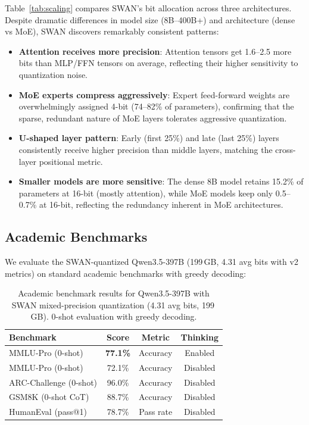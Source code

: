 \documentclass{article}
\begin{document}


Table~\ref{tab:scaling} compares SWAN's bit allocation across three architectures. Despite dramatic differences in model size (8B--400B+) and architecture (dense vs MoE), SWAN discovers remarkably consistent patterns:

\begin{itemize}
    \item \textbf{Attention receives more precision}: Attention tensors get 1.6--2.5 more bits than MLP/FFN tensors on average, reflecting their higher sensitivity to quantization noise.
    \item \textbf{MoE experts compress aggressively}: Expert feed-forward weights are overwhelmingly assigned 4-bit (74--82\% of parameters), confirming that the sparse, redundant nature of MoE layers tolerates aggressive quantization.
    \item \textbf{U-shaped layer pattern}: Early (first 25\%) and late (last 25\%) layers consistently receive higher precision than middle layers, matching the cross-layer positional metric.
    \item \textbf{Smaller models are more sensitive}: The dense 8B model retains 15.2\% of parameters at 16-bit (mostly attention), while MoE models keep only 0.5--0.7\% at 16-bit, reflecting the redundancy inherent in MoE architectures.
\end{itemize}

\subsection{Academic Benchmarks}
\label{sec:benchmarks}

We evaluate the SWAN-quantized Qwen3.5-397B (199\,GB, 4.31 avg bits with v2 metrics) on standard academic benchmarks with greedy decoding:

\begin{table}[h]
\centering
\caption{Academic benchmark results for Qwen3.5-397B with SWAN mixed-precision quantization (4.31 avg bits, 199\,GB). 0-shot evaluation with greedy decoding.}
\label{tab:benchmarks}
\begin{tabular}{lccc}
\toprule
Benchmark & Score & Metric & Thinking \\
\midrule
MMLU-Pro (0-shot) & \textbf{77.1\%} & Accuracy & Enabled \\
MMLU-Pro (0-shot) & 72.1\% & Accuracy & Disabled \\
ARC-Challenge (0-shot) & 96.0\% & Accuracy & Disabled \\
GSM8K (0-shot CoT) & 88.7\% & Accuracy & Disabled \\
HumanEval (pass@1) & 78.7\% & Pass rate & Disabled \\
\bottomrule
\end{tabular}
\end{table}
\end{document}
